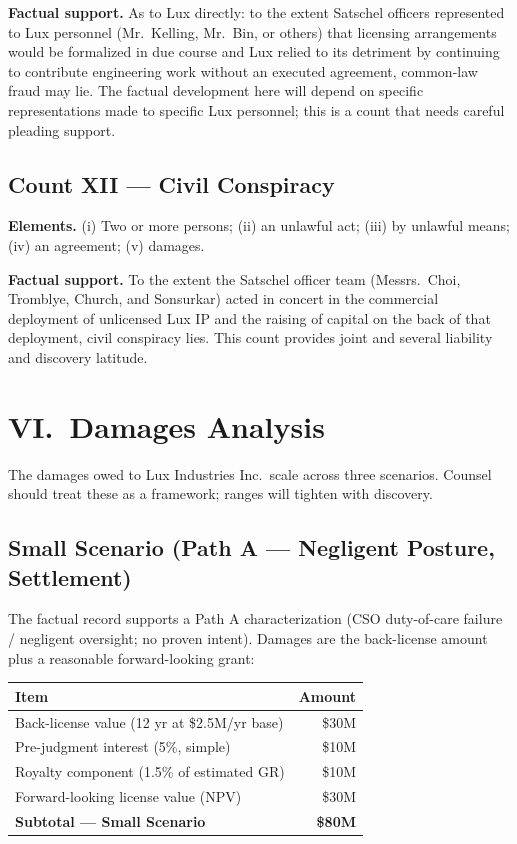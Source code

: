 \documentclass[11pt,letterpaper]{article}
\begin{document}
\textbf{Factual support.} As to Lux directly: to the extent Satschel
officers represented to Lux personnel (Mr.\ Kelling, Mr.\ Bin, or
others) that licensing arrangements would be formalized in due course
and Lux relied to its detriment by continuing to contribute engineering
work without an executed agreement, common-law fraud may lie. The
factual development here will depend on specific representations made
to specific Lux personnel; this is a count that needs careful pleading
support.

\subsection*{Count XII --- Civil Conspiracy}

\textbf{Elements.} (i) Two or more persons; (ii) an unlawful act;
(iii) by unlawful means; (iv) an agreement; (v) damages.

\textbf{Factual support.} To the extent the Satschel officer team
(Messrs.\ Choi, Tromblye, Church, and Sonsurkar) acted in concert
in the commercial deployment of unlicensed Lux IP and the raising of
capital on the back of that deployment, civil conspiracy lies. This
count provides joint and several liability and discovery latitude.

\section*{VI.\ Damages Analysis}

The damages owed to Lux Industries Inc.\ scale across three scenarios.
Counsel should treat these as a framework; ranges will tighten with
discovery.

\subsection*{Small Scenario (Path A --- Negligent Posture, Settlement)}

The factual record supports a Path A characterization (CSO duty-of-care
failure / negligent oversight; no proven intent). Damages are the
back-license amount plus a reasonable forward-looking grant:

\begin{center}
\begin{tabular}{lr}
\toprule
\textbf{Item} & \textbf{Amount} \\
\midrule
Back-license value (12 yr at \$2.5M/yr base) & \$30M \\
Pre-judgment interest (5\%, simple) & \$10M \\
Royalty component (1.5\% of estimated GR) & \$10M \\
Forward-looking license value (NPV) & \$30M \\
\midrule
\textbf{Subtotal --- Small Scenario} & \textbf{\$80M} \\
\bottomrule
\end{tabular}
\end{center}
\end{document}
